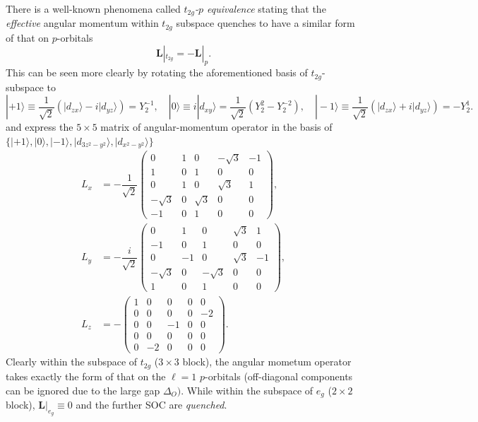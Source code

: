 \documentclass[10pt,nofootinbib,letterpaper]{revtex4}
\begin{document}
		There is a well-known phenomena called \emph{$t_{2g}$-$p$ equivalence} \cite{sugano2012multiplets} stating that the \emph{effective} angular momentum within $t_{2g}$ subspace quenches to have a similar form of that on $p$-orbitals
		\begin{equation}\label{1.1.1}
			\mathbf{L}|_{t_{2g}}=-\mathbf{L}|_{p}.
		\end{equation}
		This can be seen more clearly by rotating the aforementioned basis of $t_{2g}$-subspace to
		\begin{equation*}
			|+1\rangle\equiv\dfrac{1}{\sqrt 2}(|d_{zx}\rangle-i|d_{yz}\rangle)=Y_2^{-1},\quad |0\rangle\equiv i|d_{xy}\rangle=\dfrac{1}{\sqrt{2}}(Y_2^2-Y_2^{-2}),\quad|-1\rangle\equiv\dfrac{1}{\sqrt 2}(|d_{zx}\rangle+i|d_{yz}\rangle)=-Y_2^1.
		\end{equation*}
		and express the $5\times 5$ matrix of angular-momentum operator in the basis of $\{|+1\rangle,|0\rangle,|-1\rangle,|d_{3z^2-y^2}\rangle,|d_{x^2-y^2}\rangle\}$
		\begin{align*}
			L_x&=-\dfrac{1}{\sqrt 2}\left(\begin{array}{ccc|cc}
				0 & 1 & 0 & -\sqrt3 & -1\\
				1 & 0 & 1 & 0 & 0\\
				0 & 1 & 0 & \sqrt3 & 1\\
				\hline
				-\sqrt3 & 0 & \sqrt3 & 0 & 0\\
				-1 & 0 & 1 & 0 & 0
			\end{array}\right),\\[1em]
			L_y&=-\dfrac{i}{\sqrt{2}}\left(\begin{array}{ccc|cc}
				0 & 1 & 0 & \sqrt3 & 1\\
				-1 & 0 & 1 & 0 & 0\\
				0 & -1 & 0 & \sqrt3 & -1\\
				\hline
				-\sqrt3 & 0 & -\sqrt{3} & 0 & 0\\
				1 & 0 & 1 & 0 & 0
			\end{array}\right),\\[1em]
			L_z&=-\left(\begin{array}{ccc|cc}
				1 & 0 & 0 & 0 & 0\\
				0 & 0 & 0 & 0 & -2\\
				0 & 0 & -1 & 0 & 0\\
				\hline
				0 & 0 & 0 & 0 & 0\\
				0 & -2 & 0 & 0 & 0
			\end{array} \right).
		\end{align*}
		Clearly within the subspace of $t_{2g}$ ($3\times3$ block), the angular mometum operator takes exactly the form of that on the $\ell=1$ $p$-orbitals (off-diagonal components can be ignored due to the large gap $\Delta_O)$. While within the subspace of $e_g$ ($2\times2$ block), $\mathbf{L}|_{e_g}\equiv0$ and the further SOC are \emph{quenched}.\par
\end{document}
